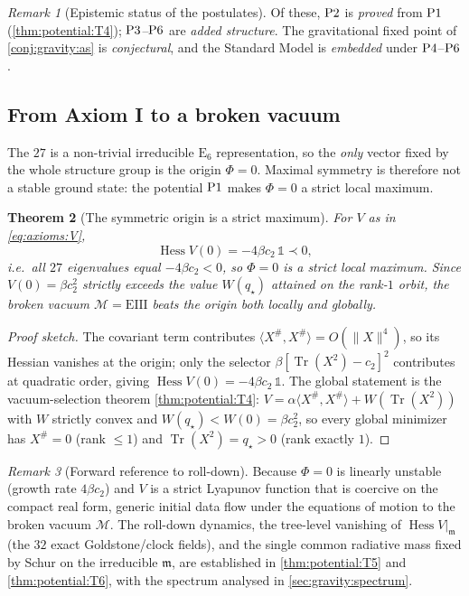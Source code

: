 \documentclass[11pt]{article}
\theoremstyle{plain}
\newtheorem{theorem}{Theorem}[section]
\theoremstyle{definition}
\theoremstyle{remark}
\newtheorem{remark}[theorem]{Remark}
\newcommand{\E}[1]{\mathrm{E}_{#1}}
\newcommand{\Hess}{\operatorname{Hess}}
\newcommand{\Tr}{\operatorname{Tr}}
\newcommand{\M}{\mathcal{M}}
\newcommand{\ESix}{\E{6}}
\newcommand{\Pone}{\textnormal{P1}}
\newcommand{\Ptwo}{\textnormal{P2}}
\newcommand{\Pthree}{\textnormal{P3}}
\newcommand{\Pfour}{\textnormal{P4}}
\newcommand{\Psix}{\textnormal{P6}}
\begin{document}
\begin{remark}[Epistemic status of the postulates]\label{rem:axioms:tagging}
Of these, $\Ptwo$ is \emph{proved} from $\Pone$ (\autoref{thm:potential:T4});
$\Pthree$--$\Psix$ are \emph{added structure}. The gravitational
fixed point of \autoref{conj:gravity:as} is \emph{conjectural}, and the
Standard Model is \emph{embedded} under $\Pfour$--$\Psix$.
\end{remark}

\subsection{From Axiom I to a broken vacuum}
\label{sec:axioms:broken}

The $27$ is a non-trivial irreducible $\ESix$ representation, so the
\emph{only} vector fixed by the whole structure group is the origin
$\Phi=0$. Maximal symmetry is therefore not a stable ground state: the
potential $\Pone$ makes $\Phi=0$ a strict local maximum.

\begin{theorem}[The symmetric origin is a strict maximum]\label{thm:axioms:origin}
For $V$ as in \eqref{eq:axioms:V},
\[
  \Hess V(0)=-4\beta c_2\,\mathbb 1\prec0,
\]
i.e.\ all $27$ eigenvalues equal $-4\beta c_2<0$, so $\Phi=0$ is a strict
local maximum. Since $V(0)=\beta c_2^2$ strictly exceeds the value
$W(q_\star)$ attained on the rank-$1$ orbit, the broken vacuum
$\M=\mathrm{EIII}$ beats the origin both locally and globally.
\end{theorem}

\begin{proof}[Proof sketch]
The covariant term contributes $\langle X^{\#},X^{\#}\rangle=O(\|X\|^4)$, so
its Hessian vanishes at the origin; only the selector $\beta[\Tr(X^2)-c_2]^2$
contributes at quadratic order, giving $\Hess V(0)=-4\beta c_2\,\mathbb 1$.
The global statement is the vacuum-selection theorem
\autoref{thm:potential:T4}: $V=\alpha\langle X^{\#},X^{\#}\rangle+W(\Tr(X^2))$
with $W$ strictly convex and $W(q_\star)<W(0)=\beta c_2^2$, so every global
minimizer has $X^{\#}=0$ (rank $\le1$) and $\Tr(X^2)=q_\star>0$ (rank
exactly $1$).
\end{proof}

\begin{remark}[Forward reference to roll-down]\label{rem:axioms:rolldown}
Because $\Phi=0$ is linearly unstable (growth rate $4\beta c_2$) and $V$ is a
strict Lyapunov function that is coercive on the compact real form, generic
initial data flow under the equations of motion to the broken vacuum $\M$.
The roll-down dynamics, the tree-level vanishing of $\Hess V|_{\mathfrak m}$
(the $32$ exact Goldstone/clock fields), and the single common radiative mass
fixed by Schur on the irreducible $\mathfrak m$, are established in
\autoref{thm:potential:T5} and \autoref{thm:potential:T6}, with the spectrum
analysed in \autoref{sec:gravity:spectrum}.
\end{remark}
\end{document}
